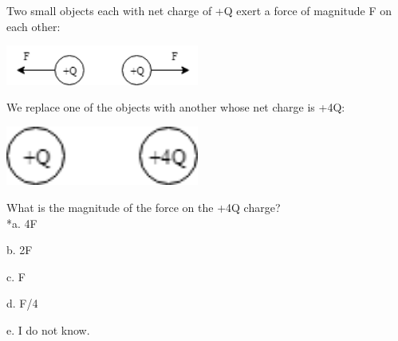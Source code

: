 
Two small objects each with net charge of +Q exert a force of magnitude F on each other:

\includegraphics[width=2.5in]{../../Images/FieldsEBHQ131.png}

We replace one of the objects with another whose net charge is +4Q:

\includegraphics[width=2.5in]{../../Images/FieldsEBHQ1312.png}


What is the magnitude of the force on the +4Q charge?\\

*a. 4F

b. 2F

c. F

d. F/4

e. I do not know.\\
